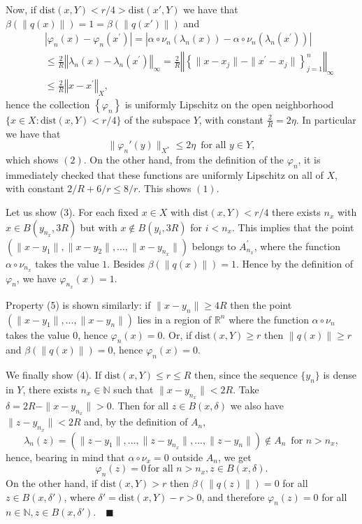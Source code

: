 \documentclass[11pt]{amsproc}%
\theoremstyle{plain}
\numberwithin{equation}{section}
\begin{document}
Now, if $\textrm{dist}(x, Y)< r/4 >\textrm{dist}(x', Y)$ we have
that $\beta(\|q(x)\|)=1=\beta(\|q(x')\|)$ and
\begin{eqnarray*}
& &\left\vert \varphi_{n}\left(  x\right)  -\varphi_{n}\left(
x^{\prime}\right) \right\vert  =\left\vert
\alpha\circ\nu_{n}\left( \lambda_{n}\left(  x\right) \right)
-\alpha\circ\nu_{n}\left( \lambda_{n}\left(  x^{\prime}\right)
\right) \right\vert \\
& &\leq\frac{2}{R}\left\Vert \lambda_{n}\left(  x\right)
-\lambda_{n}\left( x^{\prime}\right)  \right\Vert _{\infty} =
\frac{2}{R}\left\Vert \left\{  \|  x-x_{j} \| -\|
x^{\prime}-x_{j} \|  \right\}  _{j=1}^{n}\right\Vert _{\infty}\\
& &  \leq\frac{2}{R}\left\Vert x-x^{\prime}\right\Vert _{X},
\end{eqnarray*}
hence the collection $\left\{  \varphi_{n}\right\}  $ is uniformly
Lipschitz on the open neighborhood $\{x\in X: \textrm{dist}(x,
Y)<r/4\}$ of the subspace $Y$, with constant $\frac{2}{R}=2\eta$.
In particular we have that
    $$
\|{\varphi_n}'(y)\|_{X^{*}}\leq 2\eta \, \textrm{ for all } y\in
Y,
    $$
which shows $(2)$. On the other hand, from the definition of the
$\varphi_n$, it is immediately checked that these functions are
uniformly Lipschitz on all of $X$, with constant $2/R+6/r\leq
8/r$. This shows $(1)$.

\medskip

Let us show (3). For each fixed $x\in X$ with $\textrm{dist}(x,
Y)<r/4$ there exists $n_{x}$ with $x\in B(y_{n_x},3R)$ but with
$x\notin B(y_i,3R)$ for $i<n_{x}$. This implies that the point
$\left( \| x-y_{1}\|  , \| x-y_{2} \| ,..., \| x-y_{n_{x}} \|
\right) $ belongs to $A_{n_{x}}^{\prime}$, where the function
$\alpha\circ\nu_{n_{x}}$ takes the value $1$. Besides
$\beta(\|q(x)\|)=1$. Hence by the definition of $\varphi_n$, we
have $\varphi_{n_{x}}(x)=1$.

\medskip

Property (5) is shown similarly: if $\|x-y_{n}\|\geq 4R$ then the
point $(\|x-y_{1}\|, ..., \|x-y_{n}\|)$ lies in a region of
$\mathbb{R}^{n}$ where the function $\alpha\circ\nu_{n}$ takes the
value $0$, hence $\varphi_n (x)=0$. Or, if $\textrm{dist}(x,
Y)\geq r$ then $\|q(x)\|\geq r$ and $\beta(\|q(x)\|)=0$, hence
$\varphi_n (x)=0$.

\medskip

We finally show (4). If $\textrm{dist}(x,Y)\leq r\leq R$ then,
since the sequence $\{y_n\}$ is dense in $Y$, there exists
$n_x\in\mathbb{N}$ such that $\|x-y_{n_x}\|<2R$. Take
$\delta=2R-\|x-y_{n_x}\|>0$. Then for all $z\in B(x, \delta)$ we
also have $\|z-y_{n_x}\|<2R$ and, by the definition of $A_n$,
    $$
\lambda_n (z)=\left( \|z-y_1\|, ..., \|z-y_{n_x}\|, ...,
\|z-y_{n}\|\right)\notin A_n \, \textrm{ for } n>n_x,
    $$
hence, bearing in mind that $\alpha\circ\nu_x = 0$ outside $A_n$,
we get
    $$
\varphi_n(z)=0 \, \textrm{for all } n>n_x, z\in B(x, \delta).
    $$
On the other hand, if $\textrm{dist}(x,Y)>r$ then
$\beta(\|q(z)\|)=0$ for all $z\in B(x, \delta')$, where
$\delta'=\textrm{dist}(x, Y)-r>0$, and therefore $\varphi_n(z)=0$
for all $n\in\mathbb{N}, z\in B(x, \delta')$. \,\, $\blacksquare$
\end{document}

